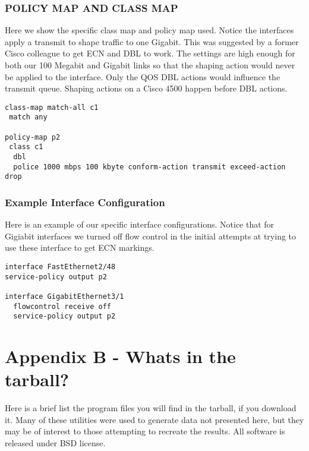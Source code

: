 \documentclass[12pt]{article}
\begin{document}
\subsubsection {POLICY MAP AND CLASS MAP}

Here we show the specific class map and policy map used. Notice
the interfaces apply a  transmit to shape traffic to one Gigabit. This was suggested
by a former Cisco colleague to get ECN and DBL to work. The settings
are high enough for both our 100 Megabit and Gigabit links so that 
the shaping action would never be applied to the interface. Only the
QOS DBL actions would influence the transmit queue. Shaping actions
on a Cisco 4500 happen before DBL actions.
\begin{verbatim}
class-map match-all c1
 match any 

policy-map p2
 class c1 
  dbl  
  police 1000 mbps 100 kbyte conform-action transmit exceed-action drop 
\end{verbatim}
\subsubsection {Example Interface Configuration}

Here is an example of our specific interface configurations. Notice that 
for Gigiabit interfaces we turned off flow control in the initial attempts at
trying to use these interface to get ECN markings.
\begin{verbatim}
interface FastEthernet2/48
service-policy output p2

interface GigabitEthernet3/1
  flowcontrol receive off
  service-policy output p2
\end{verbatim}


\section*{Appendix B - Whats in the tarball?}
Here is a brief list the program files you will find in the tarball, if you download it. Many of
these utilities were used to generate data not presented here, but they may be of interest
to those attempting to recreate the results. All software is released under BSD license.
\end{document}
